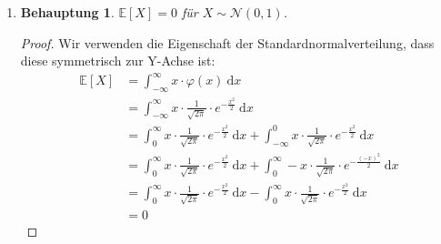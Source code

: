 \documentclass[a4paper]{scrartcl}
\newtheorem*{behaupt}{Behauptung}
\newcommand{\dif}{\ \mathrm{d}}
\newcommand{\e}{\mathbb{E}}
\def \blattnr {5}
\begin{document}
\begin{enumerate}[label=\bfseries \blattnr.\arabic*]
\begin{enumerate}
	    \item
            \begin{behaupt}
                $\e[X] = 0$ für $X \sim \mathcal{N}(0,1)$.
            \end{behaupt}
            \begin{proof}
                Wir verwenden die Eigenschaft der Standardnormalverteilung,
                dass diese symmetrisch zur Y-Achse ist:
                \begin{equation*}
                    \begin{split}
                        \e[X]
                        &= \int_{-\infty}^\infty x \cdot \varphi(x) \dif x \\
                        &= \int_{-\infty}^\infty x \cdot \frac{1}{\sqrt{2\pi}}
                        \cdot e^{-\frac{x^2}{2}} \dif x \\
                        &= \int_0^\infty x \cdot \frac{1}{\sqrt{2\pi}}
                        \cdot e^{-\frac{x^2}{2}} \dif x +
                        \int_{-\infty}^0 x \cdot \frac{1}{\sqrt{2\pi}}
                        \cdot e^{-\frac{x^2}{2}} \dif x \\
                        &= \int_0^\infty x \cdot \frac{1}{\sqrt{2\pi}}
                        \cdot e^{-\frac{x^2}{2}} \dif x +
                        \int_0^\infty -x \cdot \frac{1}{\sqrt{2\pi}}
                        \cdot e^{-\frac{(-x)^2}{2}} \dif x \\
                        &= \int_0^\infty x \cdot \frac{1}{\sqrt{2\pi}}
                        \cdot e^{-\frac{x^2}{2}} \dif x -
                        \int_0^\infty x \cdot \frac{1}{\sqrt{2\pi}}
                        \cdot e^{-\frac{x^2}{2}} \dif x \\
                        &= 0
                    \end{split}
                \end{equation*}
            \end{proof}



\end{enumerate}
\end{enumerate}
\end{document}
